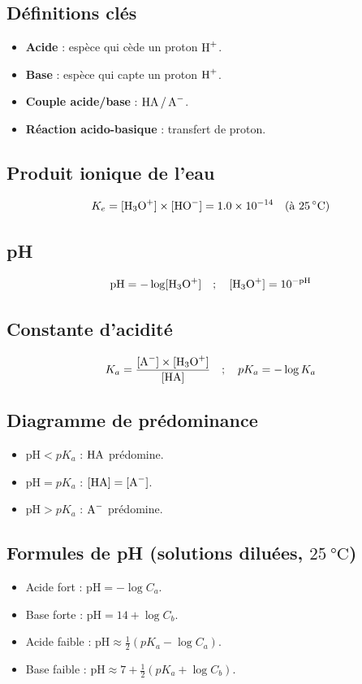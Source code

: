 \begin{synthese}
\subsection*{Définitions clés}
\begin{itemize}
    \item \textbf{Acide} : espèce qui cède un proton $\ce{H+}$.
    \item \textbf{Base} : espèce qui capte un proton $\ce{H+}$.
    \item \textbf{Couple acide/base} : $\ce{HA / A-}$.
    \item \textbf{Réaction acido-basique} : transfert de proton.
\end{itemize}

\subsection*{Produit ionique de l'eau}
\[
K_e = [\ce{H3O+}] \times [\ce{HO-}] = \num{1.0e-14} \quad (\text{à } \SI{25}{\celsius})
\]

\subsection*{pH}
\[
\text{pH} = -\log[\ce{H3O+}] \quad ; \quad [\ce{H3O+}] = 10^{-\text{pH}}
\]

\subsection*{Constante d'acidité}
\[
K_a = \frac{[\ce{A-}] \times [\ce{H3O+}]}{[\ce{HA}]} \quad ; \quad pK_a = -\log K_a
\]

\subsection*{Diagramme de prédominance}
\begin{itemize}
    \item $\text{pH} < pK_a$ : $\ce{HA}$ prédomine.
    \item $\text{pH} = pK_a$ : $[\ce{HA}] = [\ce{A-}]$.
    \item $\text{pH} > pK_a$ : $\ce{A-}$ prédomine.
\end{itemize}

\subsection*{Formules de pH (solutions diluées, $\SI{25}{\celsius}$)}
\begin{itemize}
    \item Acide fort : $\text{pH} = -\log C_a$.
    \item Base forte : $\text{pH} = 14 + \log C_b$.
    \item Acide faible : $\text{pH} \approx \frac{1}{2}(pK_a - \log C_a)$.
    \item Base faible : $\text{pH} \approx 7 + \frac{1}{2}(pK_a + \log C_b)$.
\end{itemize}


\end{synthese}
